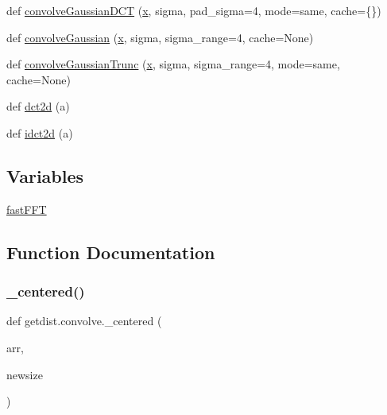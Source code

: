 \begin{DoxyCompactItemize}
def \mbox{\hyperlink{namespacegetdist_1_1convolve_acf5c938da0fecbf932f13c93050fd706}{convolve\+Gaussian\+D\+CT}} (\mbox{\hyperlink{plotTT_8m_a9336ebf25087d91c818ee6e9ec29f8c1}{x}}, sigma, pad\+\_\+sigma=4, mode=\textquotesingle{}same\textquotesingle{}, cache=\{\})
\item 
def \mbox{\hyperlink{namespacegetdist_1_1convolve_ab80d0e9a346922b403393e83be18b56e}{convolve\+Gaussian}} (\mbox{\hyperlink{plotTT_8m_a9336ebf25087d91c818ee6e9ec29f8c1}{x}}, sigma, sigma\+\_\+range=4, cache=None)
\item 
def \mbox{\hyperlink{namespacegetdist_1_1convolve_a815e19f42beb6147c053ece0d742b4b2}{convolve\+Gaussian\+Trunc}} (\mbox{\hyperlink{plotTT_8m_a9336ebf25087d91c818ee6e9ec29f8c1}{x}}, sigma, sigma\+\_\+range=4, mode=\textquotesingle{}same\textquotesingle{}, cache=None)
\item 
def \mbox{\hyperlink{namespacegetdist_1_1convolve_ace2e2b933ab66e087a6b5684c58c1746}{dct2d}} (a)
\item 
def \mbox{\hyperlink{namespacegetdist_1_1convolve_af66ecd8167eff86f753ea4fecafbe3aa}{idct2d}} (a)
\end{DoxyCompactItemize}
\subsection*{Variables}
\begin{DoxyCompactItemize}
\item 
\mbox{\hyperlink{namespacegetdist_1_1convolve_abf8e33a0989ca323d84f9ffe9b913964}{fast\+F\+FT}}
\end{DoxyCompactItemize}


\subsection{Function Documentation}
\mbox{\label{namespacegetdist_1_1convolve_adf879b81d1cce2e9098c8feca4b9d85b}} 
\subsubsection{\texorpdfstring{\+\_\+centered()}{\_centered()}}
{\footnotesize\ttfamily def getdist.\+convolve.\+\_\+centered (\begin{DoxyParamCaption}\item[{}]{arr,  }\item[{}]{newsize }\end{DoxyParamCaption})\hspace{0.3cm}{\ttfamily [private]}}



